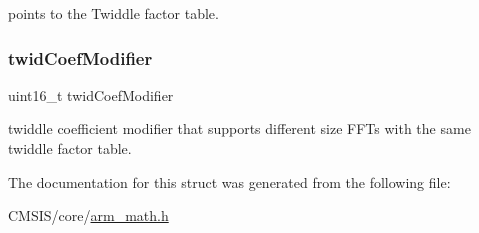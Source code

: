 points to the Twiddle factor table. \mbox{\label{structarm__cfft__radix4__instance__f32_afe772e5b5001c9d8e85032115a8df5bf}} 
\subsubsection{\texorpdfstring{twidCoefModifier}{twidCoefModifier}}
{\footnotesize\ttfamily uint16\+\_\+t twid\+Coef\+Modifier}

twiddle coefficient modifier that supports different size F\+F\+Ts with the same twiddle factor table. 

The documentation for this struct was generated from the following file\+:\begin{DoxyCompactItemize}
\item 
C\+M\+S\+I\+S/core/\mbox{\hyperlink{arm__math_8h}{arm\+\_\+math.\+h}}\end{DoxyCompactItemize}
